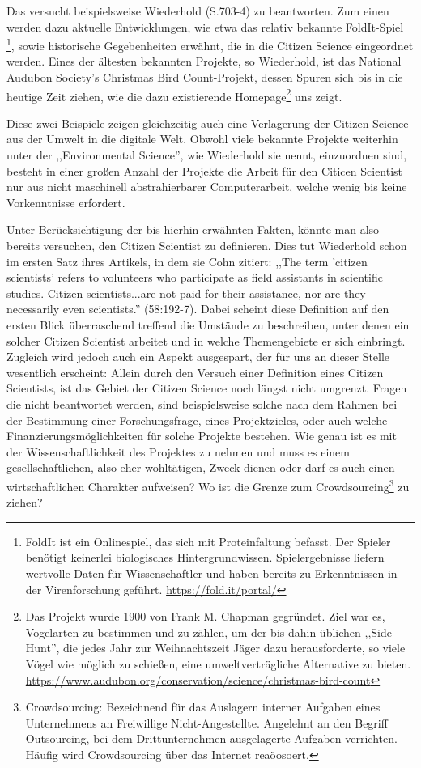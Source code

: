 \documentclass{article}
\begin{document}
Das versucht beispielsweise Wiederhold\cite{Wiederhold} (S.703-4) zu beantworten.
Zum einen werden dazu aktuelle Entwicklungen, wie etwa das relativ bekannte FoldIt-Spiel \footnote{FoldIt ist ein Onlinespiel,
das sich mit Proteinfaltung befasst. Der Spieler benötigt keinerlei biologisches Hintergrundwissen.
Spielergebnisse liefern wertvolle Daten für Wissenschaftler und haben bereits zu Erkenntnissen in der Virenforschung geführt.
\url{https://fold.it/portal/}}, sowie historische Gegebenheiten erwähnt, die in die Citizen Science eingeordnet werden.
Eines der ältesten bekannten Projekte, so Wiederhold, ist das National Audubon Society's Christmas Bird Count-Projekt,
dessen Spuren sich bis in die heutige Zeit ziehen, wie die dazu existierende Homepage\footnote{Das Projekt wurde 1900 von Frank M. Chapman gegründet.
Ziel war es, Vogelarten zu bestimmen und zu zählen, um der bis dahin üblichen ,,Side Hunt'',
die jedes Jahr zur Weihnachtszeit Jäger dazu herausforderte, so viele Vögel wie möglich zu schießen,
eine umweltverträgliche Alternative zu bieten. \url{https://www.audubon.org/conservation/science/christmas-bird-count}} uns zeigt.

Diese zwei Beispiele zeigen gleichzeitig auch eine Verlagerung der Citizen Science aus der Umwelt in die digitale Welt.
Obwohl viele bekannte Projekte weiterhin unter der ,,Environmental Science'', wie Wiederhold sie nennt, einzuordnen sind,
besteht in einer großen Anzahl der Projekte die Arbeit für den Citicen Scientist nur aus nicht maschinell abstrahierbarer Computerarbeit,
welche wenig bis keine Vorkenntnisse erfordert.

Unter Berücksichtigung der bis hierhin erwähnten Fakten, könnte man also bereits versuchen, den Citizen Scientist zu definieren.
Dies tut Wiederhold schon im ersten Satz ihres Artikels,
in dem sie Cohn zitiert: ,,The term 'citizen scientists' refers to volunteers who participate as field assistants in scientific studies.
Citizen scientists...are not paid for their assistance, nor are they necessarily even scientists.'' \cite{Cohn} (58:192-7).
Dabei scheint diese Definition auf den ersten Blick überraschend treffend die Umstände zu beschreiben,
unter denen ein solcher Citizen Scientist arbeitet und in welche Themengebiete er sich einbringt.
Zugleich wird jedoch auch ein Aspekt ausgespart, der für uns an dieser Stelle wesentlich erscheint:
Allein durch den Versuch einer Definition eines Citizen Scientists, ist das Gebiet der Citizen Science noch längst nicht umgrenzt.
Fragen die nicht beantwortet werden, sind beispielsweise solche nach dem Rahmen bei der Bestimmung einer Forschungsfrage,
eines Projektzieles, oder auch welche Finanzierungsmöglichkeiten für solche Projekte bestehen.
Wie genau ist es mit der Wissenschaftlichkeit des Projektes zu nehmen und muss es einem gesellschaftlichen, also eher wohltätigen,
Zweck dienen oder darf es auch einen wirtschaftlichen Charakter aufweisen?
Wo ist die Grenze zum Crowdsourcing\footnote{Crowdsourcing: Bezeichnend für das Auslagern interner Aufgaben eines Unternehmens an Freiwillige Nicht-Angestellte.
Angelehnt an den Begriff Outsourcing, bei dem Drittunternehmen ausgelagerte Aufgaben verrichten. Häufig wird Crowdsourcing über das Internet reaöosoert.} zu ziehen?
\end{document}
